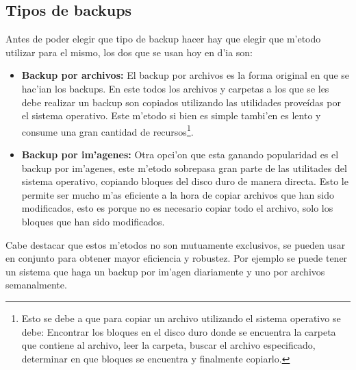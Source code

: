 \documentclass[11pt]{article}
\begin{document}
	 \subsection{Tipos de backups}
		Antes de poder elegir que tipo de backup hacer hay que elegir que m'etodo utilizar para el mismo, los dos que se usan hoy en d'ia son:
		\begin{itemize}
			\item \textbf{Backup por archivos:} El backup por archivos es la forma original en que se hac'ian los backups. En este todos los archivos y carpetas a los que se les debe realizar un backup son copiados utilizando las utilidades proveídas por el sistema operativo. Este m'etodo si bien es simple tambi'en es lento y consume una gran cantidad de recursos\footnote{Esto se debe a que para copiar un archivo utilizando el sistema operativo se debe: Encontrar los bloques en el disco duro donde se encuentra la carpeta que contiene al archivo, leer la carpeta, buscar el archivo especificado, determinar en que bloques se encuentra y finalmente copiarlo.}.
			\item \textbf{Backup por im'agenes:} Otra opci'on que esta ganando popularidad es el backup por im'agenes, este m'etodo sobrepasa gran parte de las utilitades del sistema operativo, copiando bloques del disco duro de manera directa. Esto le permite ser mucho m'as eficiente a la hora de copiar archivos que han sido modificados, esto es porque no es necesario copiar todo el archivo, solo los bloques que han sido modificados. 
		\end{itemize}

		Cabe destacar que estos m'etodos no son mutuamente exclusivos, se pueden usar en conjunto para obtener mayor eficiencia y robustez. Por ejemplo se puede tener un sistema que haga un backup por im'agen diariamente y uno por archivos semanalmente.
\end{document}

